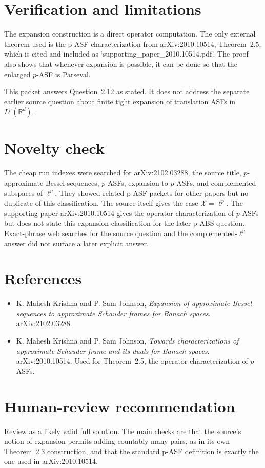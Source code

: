 \documentclass[11pt]{article}
\newcommand{\X}{\mathcal X}
\begin{document}
\section*{Verification and limitations}

The expansion construction is a direct operator computation.  The only external theorem used is the p-ASF characterization from arXiv:2010.10514, Theorem~2.5, which is cited and included as `supporting\_paper\_2010.10514.pdf'.  The proof also shows that whenever expansion is possible, it can be done so that the enlarged \(p\)-ASF is Parseval.

This packet answers Question~2.12 as stated.  It does not address the separate earlier source question about finite tight expansion of translation ASFs in \(L^p(\mathbb R^d)\).

\section*{Novelty check}

The cheap run indexes were searched for arXiv:2102.03288, the source title, \(p\)-approximate Bessel sequences, \(p\)-ASFs, expansion to \(p\)-ASFs, and complemented subspaces of \(\ell^p\).  They showed related p-ASF packets for other papers but no duplicate of this classification.  The source itself gives the case \(\X=\ell^p\).  The supporting paper arXiv:2010.10514 gives the operator characterization of \(p\)-ASFs but does not state this expansion classification for the later p-ABS question.  Exact-phrase web searches for the source question and the complemented-\(\ell^p\) answer did not surface a later explicit answer.

\section*{References}

\begin{itemize}
\item K. Mahesh Krishna and P. Sam Johnson, \emph{Expansion of approximate Bessel sequences to approximate Schauder frames for Banach spaces}.  arXiv:2102.03288.
\item K. Mahesh Krishna and P. Sam Johnson, \emph{Towards characterizations of approximate Schauder frame and its duals for Banach spaces}.  arXiv:2010.10514.  Used for Theorem~2.5, the operator characterization of \(p\)-ASFs.
\end{itemize}

\section*{Human-review recommendation}

Review as a likely valid full solution.  The main checks are that the source's notion of expansion permits adding countably many pairs, as in its own Theorem~2.3 construction, and that the standard p-ASF definition is exactly the one used in arXiv:2010.10514.
\end{document}
